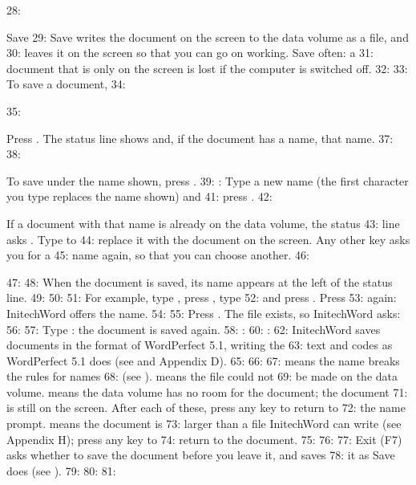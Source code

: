 28: \begin{Feature}{Save}
29: Save writes the document on the screen to the data volume as a file, and
30: leaves it on the screen so that you can go on working.  Save often: a
31: document that is only on the screen is lost if the computer is switched off.
32: 
33: To save a document,
34: \begin{WPSteps}
35: \item Press .  The status line shows  and, if the document has a name, that name.
37: 
38: \item To save under the name shown, press .
39: : Type a new name (the first character you type replaces the name shown) and
41: press .
42: \item If a document with that name is already on the data volume, the status
43: line asks .  Type  to
44: replace it with the document on the screen.  Any other key asks you for a
45: name again, so that you can choose another.
46: \end{WPSteps}
47: 
48: When the document is saved, its name appears at the left of the status line.
49: 
50: 
51: For example, type , press , type
52:  and press .  Press 
53: again: InitechWord offers the name.
54: 
55: Press .  The file  exists, so InitechWord asks:
56: 
57: Type : the document is saved again.
58: : 
60: : 
62: InitechWord saves documents in the format of WordPerfect 5.1, writing the
63: text and codes as WordPerfect 5.1 does (see  and Appendix D).
65: 
66: 
67:  means the name breaks the rules for names
68: (see ).   means the file could not
69: be made on the data volume.   means the data volume has no room for the document; the document
71: is still on the screen.  After each of these, press any key to return to
72: the name prompt.   means the document is
73: larger than a file InitechWord can write (see Appendix H); press any key to
74: return to the document.
75: 
76: 
77: Exit (F7) asks whether to save the document before you leave it, and saves
78: it as Save does (see ).
79: 
80: 
81: \end{Feature}
